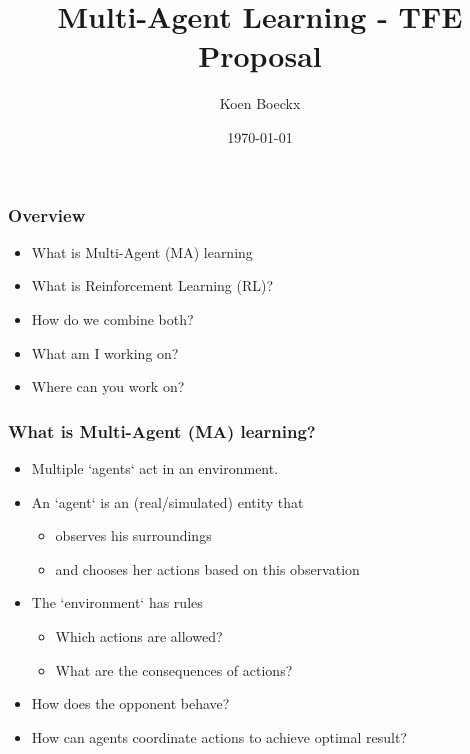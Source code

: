 \documentclass{beamer}
\title{Multi-Agent Learning - TFE Proposal}
\author{Koen Boeckx}
\institute{RMA}
\date{\today}
\begin{document}
\begin{frame}
\titlepage
\end{frame}

\begin{frame}
\frametitle{Overview}
\begin{itemize}
    \item What is Multi-Agent (MA) learning
    \item What is Reinforcement Learning (RL)?
    \item How do we combine both?
    \item What am I working on?
    \item Where can you work on?
\end{itemize}
\end{frame}

\begin{frame}
\frametitle{What is Multi-Agent (MA) learning?}
\begin{itemize}
    \item Multiple `agents` act in an environment.
    \item An `agent` is an (real/simulated) entity that
        \begin{itemize}
            \item observes his surroundings
            \item and chooses her actions based on this observation
        \end{itemize}
    \pause
    \item The `environment` has rules
        \begin{itemize}
            \item Which actions are allowed?
            \item What are the consequences of actions?
        \end{itemize}
    \pause
    \item How does the opponent behave?
    \item How can agents coordinate actions to achieve optimal result?
\end{itemize}
\end{frame}
\end{document}
